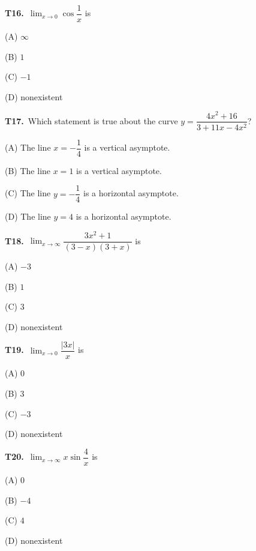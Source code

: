 \documentclass[11pt]{article}
\begin{document}
\bigskip\noindent\textbf{T16.}\ $\displaystyle\lim_{x\to 0}\cos\dfrac{1}{x}$ is
\begin{list}{}{\setlength{\leftmargin}{3em}\setlength{\labelwidth}{2.5em}\setlength{\itemsep}{0pt}\setlength{\topsep}{2pt}}
\item[(A)] $\infty$
\item[(B)] $1$
\item[(C)] $-1$
\item[(D)] nonexistent
\end{list}

\bigskip\noindent\textbf{T17.}\ Which statement is true about the curve $y = \dfrac{4x^2+16}{3+11x-4x^2}$?
\begin{list}{}{\setlength{\leftmargin}{3em}\setlength{\labelwidth}{2.5em}\setlength{\itemsep}{0pt}\setlength{\topsep}{2pt}}
\item[(A)] The line $x = -\dfrac{1}{4}$ is a vertical asymptote.
\item[(B)] The line $x = 1$ is a vertical asymptote.
\item[(C)] The line $y = -\dfrac{1}{4}$ is a horizontal asymptote.
\item[(D)] The line $y = 4$ is a horizontal asymptote.
\end{list}

\bigskip\noindent\textbf{T18.}\ $\displaystyle\lim_{x\to\infty}\dfrac{3x^2+1}{(3-x)(3+x)}$ is
\begin{list}{}{\setlength{\leftmargin}{3em}\setlength{\labelwidth}{2.5em}\setlength{\itemsep}{0pt}\setlength{\topsep}{2pt}}
\item[(A)] $-3$
\item[(B)] $1$
\item[(C)] $3$
\item[(D)] nonexistent
\end{list}

\bigskip\noindent\textbf{T19.}\ $\displaystyle\lim_{x\to 0}\dfrac{|3x|}{x}$ is
\begin{list}{}{\setlength{\leftmargin}{3em}\setlength{\labelwidth}{2.5em}\setlength{\itemsep}{0pt}\setlength{\topsep}{2pt}}
\item[(A)] $0$
\item[(B)] $3$
\item[(C)] $-3$
\item[(D)] nonexistent
\end{list}

\bigskip\noindent\textbf{T20.}\ $\displaystyle\lim_{x\to\infty} x\sin\dfrac{4}{x}$ is
\begin{list}{}{\setlength{\leftmargin}{3em}\setlength{\labelwidth}{2.5em}\setlength{\itemsep}{0pt}\setlength{\topsep}{2pt}}
\item[(A)] $0$
\item[(B)] $-4$
\item[(C)] $4$
\item[(D)] nonexistent
\end{list}
\end{document}
